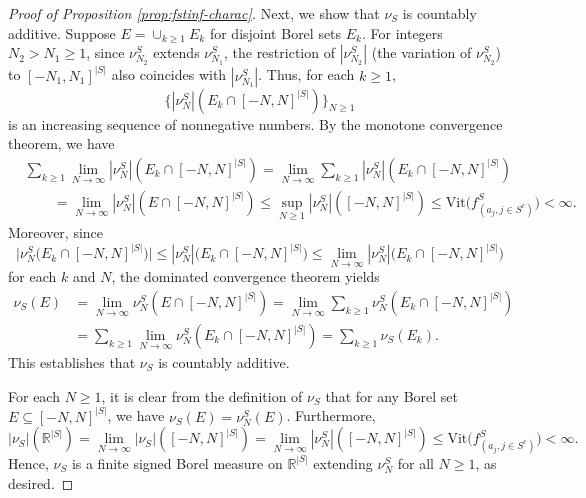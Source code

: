 \documentclass[10pt]{article}
\newcommand{\R}{{\mathbb R}}
\newcommand{\vit}{{\text{Vit}}}
\begin{document}
\begin{proof}[Proof of Proposition \ref{prop:fstinf-charac}]
Next, we show that $\nu_S$ is countably additive. Suppose 
$E = \cup_{k \ge 1} E_k$ for disjoint Borel sets $E_k$.
For integers $N_2 > N_1 \ge 1$, since $\nu^S_{N_2}$ extends $\nu^S_{N_1}$,
the restriction of $|\nu^S_{N_2}|$ (the variation of $\nu^S_{N_2}$) to 
$[-N_1, N_1]^{|S|}$ also coincides with $|\nu^S_{N_1}|$. Thus, for each 
$k \ge 1$, 
\begin{equation*}
    \big\{|\nu^S_{N}|(E_k \cap [-N, N]^{|S|})\big\}_{N \ge 1}
\end{equation*}
is an increasing sequence of nonnegative numbers. By the monotone 
convergence theorem, we have
\begin{equation*}
\begin{aligned}
    &\sum_{k \ge 1} \lim_{N \to \infty} 
    |\nu^S_{N}|(E_k \cap [-N, N]^{|S|}) 
    = \lim_{N \to \infty} \sum_{k \ge 1} 
    |\nu^S_{N}|(E_k \cap [-N, N]^{|S|}) \\
    &\qquad= \lim_{N \to \infty} |\nu^S_{N}|(E \cap [-N, N]^{|S|})
    \le \sup_{N \ge 1} |\nu^S_{N}|([-N, N]^{|S|}) 
    \le \vit\big(f^S_{(a_j, j \in S^c)}\big) < \infty.
\end{aligned}
\end{equation*}
Moreover, since 
\begin{equation*}
    \big|\nu^S_{N}\big(E_k \cap [-N, N]^{|S|}\big)\big|
    \le |\nu^S_{N}|\big(E_k \cap [-N, N]^{|S|}\big)
    \le \lim_{N \to \infty} |\nu^S_{N}|\big(E_k \cap [-N, N]^{|S|}\big)
\end{equation*}
for each $k$ and $N$, the dominated convergence theorem yields
\begin{equation*}
\begin{aligned}
    \nu_S(E) &= \lim_{N \to \infty} \nu^S_{N}(E \cap [-N, N]^{|S|}) 
    = \lim_{N \to \infty} \sum_{k \ge 1} 
    \nu^S_{N}(E_k \cap [-N, N]^{|S|}) \\
    &= \sum_{k \ge 1} \lim_{N \to \infty} 
    \nu^S_{N}(E_k \cap [-N, N]^{|S|}) 
    = \sum_{k \ge 1} \nu_S(E_k).
\end{aligned}
\end{equation*}
This establishes that $\nu_S$ is countably additive.

For each $N \ge 1$, it is clear from the definition of $\nu_S$ that for any 
Borel set $E \subseteq [-N, N]^{|S|}$, we have $\nu_S(E) = \nu^S_{N}(E)$.
Furthermore,
\begin{equation*}
    |\nu_S|(\R^{|S|}) = \lim_{N \to \infty} |\nu_S|([-N, N]^{|S|}) 
    = \lim_{N \to \infty} |\nu^S_{N}|([-N, N]^{|S|}) 
    \le \vit\big(f^S_{(a_j, j \in S^c)}\big) < \infty.
\end{equation*}
Hence, $\nu_S$ is a finite signed Borel measure on $\R^{|S|}$ 
extending $\nu^S_{N}$ for all $N \ge 1$, as desired.


\end{proof}
\end{document}
